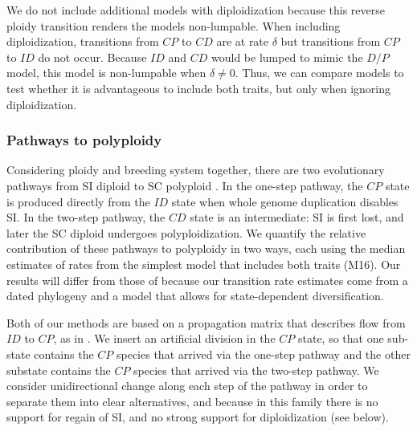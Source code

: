 We do not include additional models with diploidization because this reverse ploidy transition renders the models non-lumpable.
When including diploidization, transitions from $CP$ to $CD$ are at rate $\delta$ but transitions from $CP$ to $ID$ do not occur.
Because $ID$ and $CD$ would be lumped to mimic the $D/P$ model, this model is non-lumpable when $\delta \ne 0$.
Thus, we can compare models to test whether it is advantageous to include both traits, but only when ignoring diploidization.

\subsubsection{Pathways to polyploidy}

Considering ploidy and breeding system together, there are two evolutionary pathways from SI diploid to SC polyploid \citep{brunet2001, robertson_2011}.
In the one-step pathway, the $CP$ state is produced directly from the $ID$ state when whole genome duplication disables SI.
In the two-step pathway, the $CD$ state is an intermediate: SI is first lost, and later the SC diploid undergoes polyploidization.
We quantify the relative contribution of these pathways to polyploidy in two ways, each using the median estimates of rates from the simplest model that includes both traits (M16). Our results will differ from those of \citet{robertson_2011} because our transition rate estimates come from a dated phylogeny and a model that allows for state-dependent diversification. %

Both of our methods are based on a propagation matrix that describes flow from $ID$ to $CP$, as in \citet{robertson_2011}.
We insert an artificial division in the $CP$ state, so that one sub-state contains the $CP$ species that arrived via the one-step pathway and the other substate contains the $CP$ species that arrived via the two-step pathway.
We consider unidirectional change along each step of the pathway in order to separate them into clear alternatives, and because in this family there is no support for regain of SI, and no strong support for diploidization (see below).

